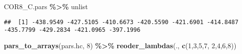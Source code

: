 \documentclass[
]{article}
\newenvironment{Shaded}{\begin{snugshade}}{\end{snugshade}}
\newcommand{\DecValTok}[1]{\textcolor[rgb]{0.00,0.00,0.81}{#1}}
\newcommand{\FunctionTok}[1]{\textcolor[rgb]{0.13,0.29,0.53}{\textbf{#1}}}
\newcommand{\NormalTok}[1]{#1}
\newcommand{\SpecialCharTok}[1]{\textcolor[rgb]{0.81,0.36,0.00}{\textbf{#1}}}
\begin{document}
\begin{Shaded}
\begin{Highlighting}[]
\NormalTok{COR8\_C.pars }\SpecialCharTok{\%\textgreater{}\%}\NormalTok{ unlist}
\end{Highlighting}
\end{Shaded}

\begin{verbatim}
##  [1] -438.9549 -427.5105 -410.6673 -420.5590 -421.6901 -414.8487 -435.7799 -429.2834 -421.0965 -397.1996
\end{verbatim}

\begin{Shaded}
\begin{Highlighting}[]
\FunctionTok{pars\_to\_arrays}\NormalTok{(pars.hc, }\DecValTok{8}\NormalTok{) }\SpecialCharTok{\%\textgreater{}\%} \FunctionTok{reoder\_lambdas}\NormalTok{(., }\FunctionTok{c}\NormalTok{(}\DecValTok{1}\NormalTok{,}\DecValTok{3}\NormalTok{,}\DecValTok{5}\NormalTok{,}\DecValTok{7}\NormalTok{, }\DecValTok{2}\NormalTok{,}\DecValTok{4}\NormalTok{,}\DecValTok{6}\NormalTok{,}\DecValTok{8}\NormalTok{))}
\end{Highlighting}
\end{Shaded}
\end{document}
